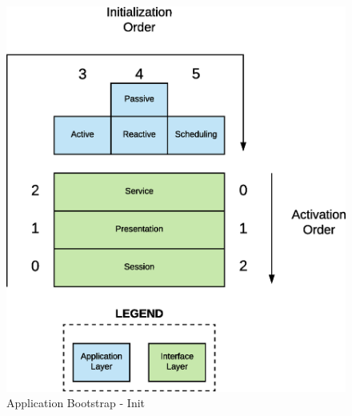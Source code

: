 \begin{figure}[H]
  \centering
  \includegraphics[scale=0.5,keepaspectratio]
    {images/solution/init_activate.eps}
  \caption{Application Bootstrap - Init}
  \label{fig:sd-app-init}
\end{figure}



